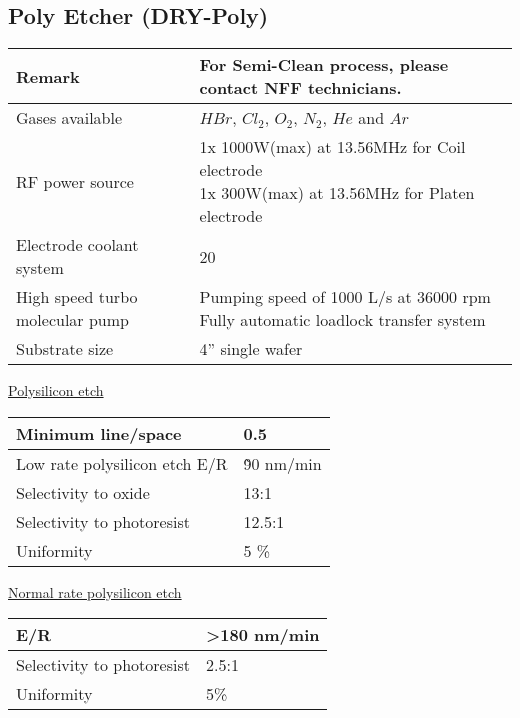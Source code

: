 \subsection{Poly Etcher (DRY-Poly)}\label{poly_etcher_machine}
\WaferClean\WaferSemiClean

	\begin{tabular}{|p{6cm}|p{9cm}|}
		\hline
		Remark &
		For Semi-Clean process, please contact NFF technicians. \\
		\hline
		Gases available &
		$H Br$, $Cl_2$, $O_2$, $N_2$, $He$ and $Ar$ \\
		\hline
		RF power source &
		\makecell[l]{
			\tabitem 1x 1000W(max) at 13.56MHz for Coil electrode \\
			\tabitem 1x 300W(max)  at 13.56MHz for Platen electrode
		} \\
		\hline
		Electrode coolant system &
		20 \degreesC \\
		\hline
		High speed turbo molecular pump &
		\makecell[l]{
			\tabitem Pumping speed of 1000 L/s at 36000 rpm \\
			\tabitem Fully automatic loadlock transfer system
		} \\
		\hline
		Substrate size &
		4” single wafer \\
		\hline
	\end{tabular}

\begin{mdframed}
	\underline{Polysilicon etch}

	\begin{tabular}{|p{5cm}|p{6cm}|}
		\hline
		Minimum line/space &
		0.5\um \\
		\hline
		Low rate polysilicon etch E/R &
		\~ 90 nm/min \\
		\hline
		Selectivity to oxide &
		13:1 \\
		\hline
		Selectivity to photoresist &
		12.5:1 \\
		\hline
		Uniformity &
		5 \% \\
		\hline
	\end{tabular}
\end{mdframed}
\begin{mdframed}
	\underline{Normal rate polysilicon etch}

	\begin{tabular}{|p{5cm}|p{6cm}|}
		\hline
		E/R &
		>180 nm/min \\
		\hline
		Selectivity to photoresist &
		2.5:1 \\
		\hline
		Uniformity &
		5\% \\
		\hline
	\end{tabular}
\end{mdframed}